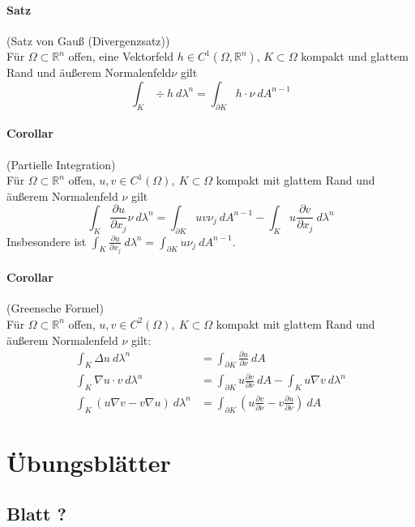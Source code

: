 \documentclass[12pt,a4paper,fleqn]{article}
\def\R{{\mathbb{R}}}
\begin{document}
\paragraph{Satz} (Satz von Gauß (Divergenzsatz))\\
Für $\Omega \subset \R^n$ offen, eine Vektorfeld $h \in C^1(\Omega, \R^n)$, $K\subset \Omega$ kompakt und glattem Rand und äußerem Normalenfeld$\nu$ gilt
\begin{displaymath}
\int_K \div h\ d\lambda^n = \int_{\partial K} h \cdot \nu\ dA^{n-1}
\end{displaymath}

\paragraph{Corollar} (Partielle Integration)\\
Für $\Omega \subset \R^n$ offen, $u, v \in C^1(\Omega),\ K\subset\Omega$ kompakt mit glattem Rand und äußerem Normalenfeld $\nu$ gilt
\begin{displaymath}
\int_K\frac{\partial u}{\partial x_j} \nu\ d\lambda^n = \int_{\partial K} uv\nu_j\ dA^{n-1} - \int_K u\frac{\partial v}{\partial x_j}\ d\lambda^n
\end{displaymath}
Insbesondere ist $\int_K \frac{\partial u}{\partial x_j}\ d\lambda^n = \int_{\partial K} u\nu_j\ dA^{n-1}$.

\paragraph{Corollar} (Greensche Formel)\\
Für $\Omega \subset \R^n$ offen, $u, v \in C^2(\Omega),\ K\subset \Omega$ kompakt mit glattem Rand und äußerem Normalenfeld $\nu$ gilt:
\begin{align*}
\int_K  \Delta u\ d\lambda^n &= \int_{\partial K} \frac{\partial u}{\partial \nu}\ dA\\
\int_K \nabla u \cdot v\ d\lambda^n &= \int_{\partial K} u\frac{\partial v}{\partial \nu}\ dA - \int_K u\nabla v\ d\lambda^n\\
\int_K(u\nabla v - v\nabla u)\ d\lambda^n &= \int_{\partial K} \left(u\frac{\partial v}{\partial \nu} - v\frac{\partial u}{\partial \nu}\right)\ dA
\end{align*}

\newpage

\section{Übungsblätter}

\subsection{Blatt ?}
\end{document}
